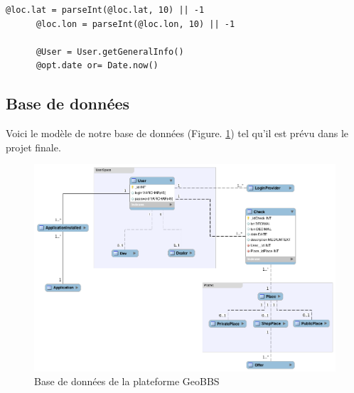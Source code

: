 \documentclass[a4paper,12pt]{report}
\begin{document}
\begin{onehalfspace}
\begin{lstlisting}[float=htb, frame=lines, caption={Model Check}, label={code:modelCheck}]
      @loc.lat = parseInt(@loc.lat, 10) || -1
      @loc.lon = parseInt(@loc.lon, 10) || -1

      @User = User.getGeneralInfo()
      @opt.date or= Date.now()
\end{lstlisting}


\subsection{Base de données}
Voici le modèle de notre base de données (Figure. \ref{fig:amqp1}) tel qu'il est prévu dans le projet finale.

\begin{figure}[htb]
  \centering
  \includegraphics[width=\textwidth]{diagrameBDD/model.png}
  \caption{Base de données de la plateforme GeoBBS}
  \label{fig:amqp1}
\end{figure}

  \end{onehalfspace}
\end{document}
